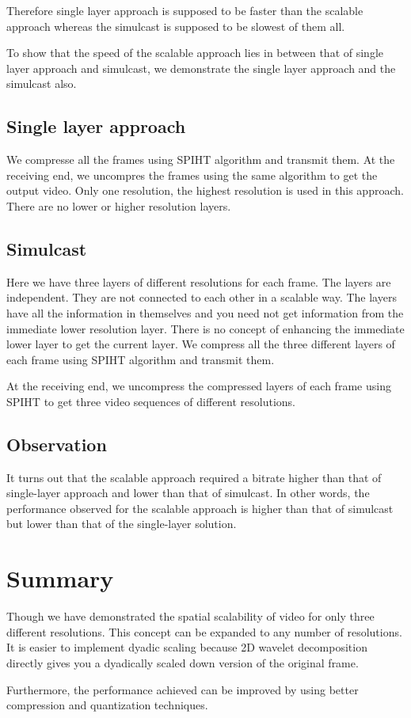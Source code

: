 \documentclass[10pt,twocolumn]{article}
\begin{document}
Therefore single layer approach is supposed to be faster than the scalable approach whereas the simulcast is supposed to be slowest of them all\cite{segall2007}.

To show that the speed of the scalable approach lies in between that of single layer approach and simulcast, we demonstrate the single layer approach and the simulcast also.

\subsection*{Single layer approach}
We compresse all the frames using SPIHT algorithm and transmit them. At the receiving end, we uncompres the frames using the same algorithm to get the output video. Only one resolution, the highest resolution is used in this approach. There are no lower or higher resolution layers.

\subsection*{Simulcast}

Here we have three layers of different resolutions for each frame. The layers are independent. They are not connected to each other in a scalable way. The layers have all the information in themselves and you need not get information from the immediate lower resolution layer. There is no concept of enhancing the immediate lower layer to get the current layer. We compress all the three different layers of each frame using SPIHT algorithm and transmit them.

At the receiving end, we uncompress the compressed layers of each frame using SPIHT to get three video sequences of different resolutions.

\subsection*{Observation}
It turns out that the scalable approach required a bitrate higher than that of single-layer approach and lower than that of simulcast. In other words, the performance observed for the scalable approach is higher than that of simulcast but lower than that of the single-layer solution.

\section{Summary}

Though we have demonstrated the spatial scalability of video for only three different resolutions. This concept can be expanded to any number of resolutions. It is easier to implement dyadic scaling because 2D wavelet decomposition directly gives you a dyadically scaled down version of the original frame.

Furthermore, the performance achieved can be improved by using better compression and quantization techniques.



\end{document}

